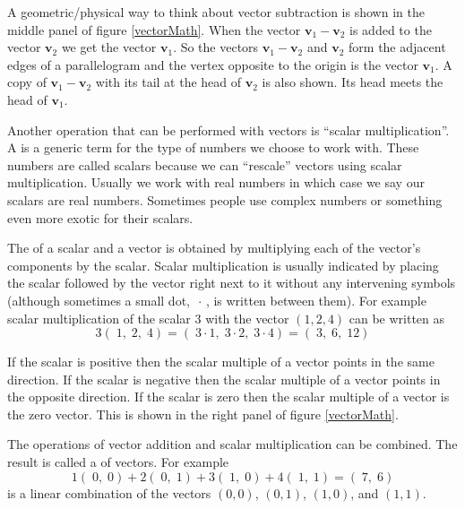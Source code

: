    A geometric/physical way to think about vector subtraction is shown in the 
middle panel of figure \ref{vectorMath}. When the vector $\mathbf{v}_1 - 
\mathbf{v}_2$ is added to the vector $\mathbf{v}_2$ we get the vector 
$\mathbf{v}_1$. So the vectors $\mathbf{v}_1 - \mathbf{v}_2$ and 
$\mathbf{v}_2$ form the adjacent edges of a parallelogram and the vertex opposite
to the origin is the vector $\mathbf{v}_1$. A copy of $\mathbf{v}_1 - 
\mathbf{v}_2$ with its tail at the head of $\mathbf{v}_2$ is also shown. Its
head meets the head of $\mathbf{v}_1$.

   Another operation that can be performed with vectors is ``scalar 
multiplication''. A  is a generic term for the type of
numbers we choose to work with. These numbers are called scalars because we 
can ``rescale'' vectors using scalar multiplication. Usually we work with real 
numbers in which case we say our scalars are real numbers. Sometimes people 
use complex numbers or something even more exotic for their scalars. 

   The  of a scalar and a vector is obtained by
multiplying each of the vector's components by the scalar. Scalar
multiplication is usually indicated by placing the scalar followed by the 
vector right next to it without any intervening symbols (although sometimes a 
small dot, $\, \cdot\, $, is written between them). For example scalar 
multiplication of the scalar $3$ with the vector $( 1, 2, 4)$ can be written as
\begin{equation*}
3(\; 1, \; 2, \; 4) = (\; 3 \cdot 1, \; 3 \cdot 2, \; 3 \cdot 4) 
= (\; 3,\; 6, \; 12)
\end{equation*}

   If the scalar is positive then the scalar multiple of a vector points in the 
same direction. If the scalar is negative then the scalar multiple of a vector 
points in the opposite direction. If the scalar is zero then the scalar 
multiple of a vector is the zero vector. This is shown in the right panel of 
figure \ref{vectorMath}. 

   The operations of vector addition and scalar multiplication can be combined.
The result is called a  of vectors. For example
\begin{equation*}
  1 (\; 0,\; 0) + 2 (\; 0,\; 1) + 3 (\; 1,\; 0) + 4 (\; 1,\; 1) =  (\; 7,\; 6)
\end{equation*}
is a linear combination of the vectors $(0,0)$, $(0,1)$, $(1,0)$, and $(1,1)$.

